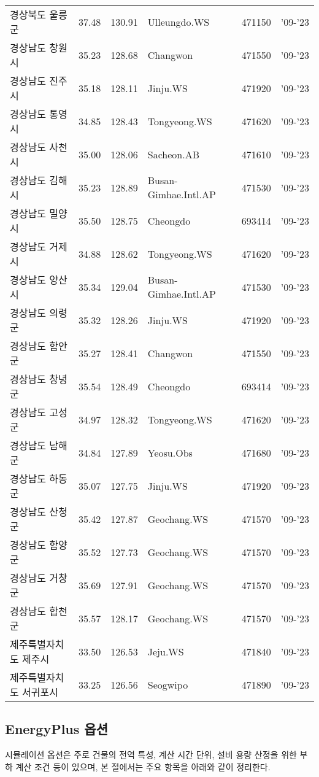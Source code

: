 \begin{longtable}{lcclcc}
  경상북도 울릉군 & 37.48 & 130.91 & Ulleungdo.WS & 471150 & '09-'23 \\
  경상남도 창원시 & 35.23 & 128.68 & Changwon & 471550 & '09-'23 \\
  경상남도 진주시 & 35.18 & 128.11 & Jinju.WS & 471920 & '09-'23 \\
  경상남도 통영시 & 34.85 & 128.43 & Tongyeong.WS & 471620 & '09-'23 \\
  경상남도 사천시 & 35.00 & 128.06 & Sacheon.AB & 471610 & '09-'23 \\
  경상남도 김해시 & 35.23 & 128.89 & Busan-Gimhae.Intl.AP & 471530 & '09-'23 \\
  경상남도 밀양시 & 35.50 & 128.75 & Cheongdo & 693414 & '09-'23 \\
  경상남도 거제시 & 34.88 & 128.62 & Tongyeong.WS & 471620 & '09-'23 \\
  경상남도 양산시 & 35.34 & 129.04 & Busan-Gimhae.Intl.AP & 471530 & '09-'23 \\
  경상남도 의령군 & 35.32 & 128.26 & Jinju.WS & 471920 & '09-'23 \\
  경상남도 함안군 & 35.27 & 128.41 & Changwon & 471550 & '09-'23 \\
  경상남도 창녕군 & 35.54 & 128.49 & Cheongdo & 693414 & '09-'23 \\
  경상남도 고성군 & 34.97 & 128.32 & Tongyeong.WS & 471620 & '09-'23 \\
  경상남도 남해군 & 34.84 & 127.89 & Yeosu.Obs & 471680 & '09-'23 \\
  경상남도 하동군 & 35.07 & 127.75 & Jinju.WS & 471920 & '09-'23 \\
  경상남도 산청군 & 35.42 & 127.87 & Geochang.WS & 471570 & '09-'23 \\
  경상남도 함양군 & 35.52 & 127.73 & Geochang.WS & 471570 & '09-'23 \\
  경상남도 거창군 & 35.69 & 127.91 & Geochang.WS & 471570 & '09-'23 \\
  경상남도 합천군 & 35.57 & 128.17 & Geochang.WS & 471570 & '09-'23 \\
  제주특별자치도 제주시 & 33.50 & 126.53 & Jeju.WS & 471840 & '09-'23 \\
  제주특별자치도 서귀포시 & 33.25 & 126.56 & Seogwipo & 471890 & '09-'23 \\
\end{longtable}

\subsection{EnergyPlus 옵션} 시뮬레이션 옵션은 주로 건물의 전역 특성, 계산 시간 단위, 설비 용량 산정을 위한 부하 계산 조건 등이 있으며, 본 절에서는 주요 항목을 아래와 같이 정리한다.

